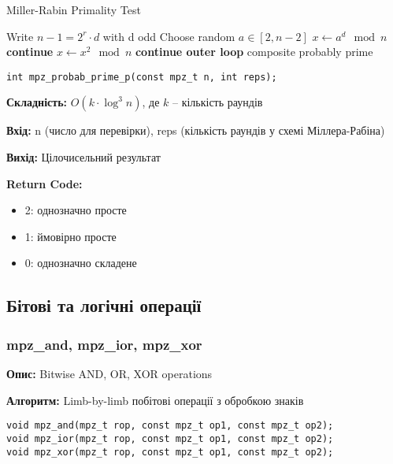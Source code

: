 \begin{algorithm}
    \caption{Miller-Rabin Primality Test}
    \begin{algorithmic}[1]
        \State Write $n-1 = 2^{r} \cdot d$ with d odd
        \State Choose random $a \in [2, n-2]$
        \State $x \gets a^{d} \mod n$
        \State \textbf{continue}
        \EndIf
        \State $x \gets x^{2} \mod n$
        \State \textbf{continue outer loop}
        \EndIf
        \EndFor
        \State \Return composite
        \EndFor
        \State \Return probably prime
        \EndFunction
    \end{algorithmic}
\end{algorithm}

\begin{verbatim}
int mpz_probab_prime_p(const mpz_t n, int reps);
\end{verbatim}

\textbf{Складність:} $O(k \cdot \log^{3} n)$, де $k$ -- кількість раундів

\textbf{Вхід:} n (число для перевірки), reps (кількість раундів у схемі Міллера-Рабіна)

\textbf{Вихід:} Цілочисельний результат

\textbf{Return Code:}
\begin{itemize}
    \item 2: однозначно просте
    \item 1: ймовірно просте
    \item 0: однозначно складене
\end{itemize}

\subsection{Бітові та логічні операції}

\subsubsection{mpz\_and, mpz\_ior, mpz\_xor}
\textbf{Опис:} Bitwise AND, OR, XOR operations

\textbf{Алгоритм:} Limb-by-limb побітові операції з обробкою знаків

\begin{verbatim}
void mpz_and(mpz_t rop, const mpz_t op1, const mpz_t op2);
void mpz_ior(mpz_t rop, const mpz_t op1, const mpz_t op2);
void mpz_xor(mpz_t rop, const mpz_t op1, const mpz_t op2);
\end{verbatim}


